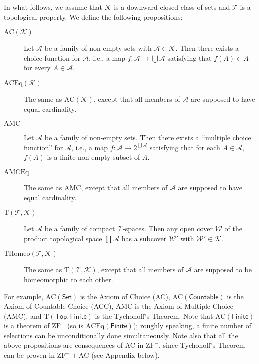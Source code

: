 \documentclass{article}
\begin{document}
In what follows, we assume that $\mathcal{K}$ is a downward closed class of sets and $\mathcal{T}$ is a topological property.
We define the following propositions:
\begin{description}
\item[$\mathrm{AC}(\mathcal{K})$]
Let $\mathcal{A}$ be a family of non-empty sets with $\mathcal{A} \in \mathcal{K}$.
Then there exists a choice function for $\mathcal{A}$, i.e., a map $f \colon \mathcal{A} \to \bigcup \mathcal{A}$ satisfying that $f(A) \in A$ for every $A \in \mathcal{A}$.
\item[$\mathrm{ACEq}(\mathcal{K})$]
The same as $\mathrm{AC}(\mathcal{K})$, except that all members of $\mathcal{A}$ are supposed to have equal cardinality.
\item[$\mathrm{AMC}$]
Let $\mathcal{A}$ be a family of non-empty sets.
Then there exists a \lq\lq multiple choice function'' for $\mathcal{A}$, i.e., a map $f \colon \mathcal{A} \to 2^{\bigcup \mathcal{A}}$ satisfying that for each $A \in \mathcal{A}$, $f(A)$ is a finite non-empty subset of $A$.
\item[$\mathrm{AMCEq}$]
The same as $\mathrm{AMC}$, except that all members of $\mathcal{A}$ are supposed to have equal cardinality.
\item[$\mathrm{T}(\mathcal{T},\mathcal{K})$]
Let $\mathcal{A}$ be a family of compact $\mathcal{T}$-spaces.
Then any open cover $\mathcal{W}$ of the product topological space $\prod \mathcal{A}$ has a subcover $\mathcal{W}'$ with $\mathcal{W}' \in \mathcal{K}$.
\item[$\mathrm{THomeo}(\mathcal{T},\mathcal{K})$]
The same as $\mathrm{T}(\mathcal{T},\mathcal{K})$, except that all members of $\mathcal{A}$ are supposed to be homeomorphic to each other.
\end{description}
For example, $\mathrm{AC}(\mathsf{Set})$ is the Axiom of Choice (AC), $\mathrm{AC}(\mathsf{Countable})$ is the Axiom of Countable Choice (ACC), $\mathrm{AMC}$ is the Axiom of Multiple Choice (AMC), and $\mathrm{T}(\mathsf{Top},\mathsf{Finite})$ is the Tychonoff's Theorem.
Note that $\mathrm{AC}(\mathsf{Finite})$ is a theorem of $\mathrm{ZF}^-$ (so is $\mathrm{ACEq}(\mathsf{Finite})$); roughly speaking, a finite number of selections can be unconditionally done simultaneously.
Note also that all the above propositions are consequences of AC in $\mathrm{ZF}^-$, since Tychonoff's Theorem can be proven in $\mathrm{ZF}^- + \mathrm{AC}$ (see Appendix below).
\end{document}
